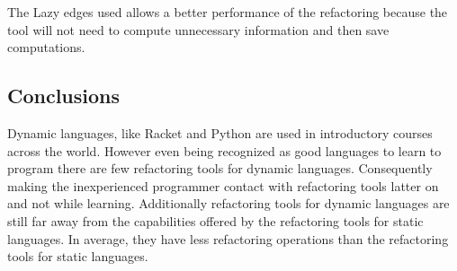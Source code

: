 The Lazy edges used allows a better performance of the refactoring because the tool will not need to compute unnecessary information and then save computations.




\subsection{Conclusions}







Dynamic languages, like Racket and Python are used in introductory courses across the world.
However even being recognized as good languages to learn to program there are few refactoring tools for dynamic languages. 
Consequently making the inexperienced programmer contact with refactoring tools latter on and not while learning.
Additionally refactoring tools for dynamic languages are still far away from the capabilities offered by the refactoring tools for static languages. 
In average, they have less refactoring operations than the refactoring tools for static languages.

